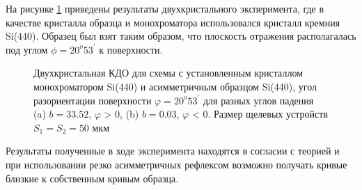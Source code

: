 
  На рисунке \ref{ris:assymetric_exp_50}
  приведены результаты двухкристального эксперимента, где в качестве
  кристалла образца и монохроматора использовался кристалл кремния Si(440). Образец был взят таким
  образом, что плоскость отражения располагалась под углом $\phi = 20^o 53^{'}$ к поверхности.

  \begin{figure}[H]
    \centering
    \hfill
    \caption{Двухкристальная КДО для схемы с установленным кристаллом монохроматором Si(440) и асимметричным образцом Si(440),
    угол разориентации поверхности $\varphi = 20^o53^{'}$ для разных углов падения (a) $b = 33.52$, $\varphi$ > 0, (b) $b = 0.03$, $\varphi$ < 0.
     Размер щелевых устройств $S_1 = S_2 = 50$ мкм}
    \label{ris:assymetric_exp_50}
  \end{figure}

Результаты полученные в ходе эксперимента находятся в согласии с теорией и при использовании резко
асимметричных рефлексом возможно получать кривые близкие к собственным кривым образца.

